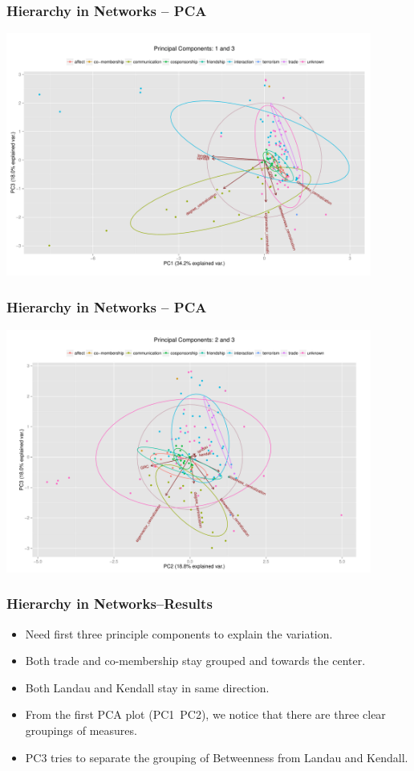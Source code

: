 \documentclass[xcolor={table}]{beamer}
\newenvironment{changemargin}[2]{%
  \begin{list}{}{%
    \setlength{\topsep}{0pt}%
    \setlength{\leftmargin}{#1}%
    \setlength{\rightmargin}{#2}%
    \setlength{\listparindent}{\parindent}%
    \setlength{\itemindent}{\parindent}%
    \setlength{\parsep}{\parskip}%
  }%
  \item[]}{\end{list}}
\begin{document}
\begin{frame}\frametitle{Hierarchy in Networks -- PCA}
	\begin{changemargin}{-2cm}{ -2cm}
		\centering
		\includegraphics[width=12cm, height=8cm]{images/Observed_PCA_Components1_3.pdf}
	\end{changemargin}
\end{frame}

\begin{frame}\frametitle{Hierarchy in Networks -- PCA}
	\begin{changemargin}{-2cm}{ -2cm}
		\centering
		\includegraphics[width=12cm, height=8cm]{images/Observed_PCA_Components2_3.pdf}
	\end{changemargin}
\end{frame}

\begin{frame}\frametitle{Hierarchy in Networks--Results}
	\begin{itemize}
		\item Need first three principle components to explain the variation.
		\item Both trade and co-membership stay grouped and towards the center. 
		\item Both Landau and Kendall stay in same direction.
		\item From the first PCA plot (PC1~PC2), we notice that there are three clear groupings of measures.
		\item PC3 tries to separate the grouping of Betweenness from Landau and Kendall. 
	\end{itemize}
\end{frame}
\end{document}
